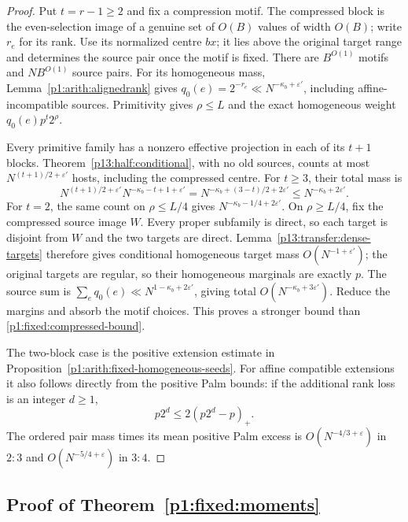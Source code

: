 \begin{proof}
Put $t=r-1\ge2$ and fix a compression motif. The compressed block
is the even-selection image of a genuine set of $O(B)$ values of
width $O(B)$; write $r_e$ for its rank.
Use its normalized centre $bx$; it lies above the original target
range and determines the source pair once the motif is fixed.
There are $B^{O(1)}$ motifs and $NB^{O(1)}$ source pairs.
For its homogeneous mass, Lemma~\ref{p1:arith:alignedrank} gives
$q_0(e)=2^{-r_e}\ll N^{-\kappa_b+\varepsilon'}$, including
affine-incompatible sources. Primitivity gives $\rho\le L$ and
the exact homogeneous weight $q_0(e)p^t2^\rho$.

Every primitive family has a nonzero effective projection in each
of its $t+1$ blocks. Theorem~\ref{p13:half:conditional}, with no old
sources, counts at most $N^{(t+1)/2+\varepsilon'}$ hosts,
including the compressed centre. For $t\ge3$, their total mass is
\[
 N^{(t+1)/2+\varepsilon'}N^{-\kappa_b-t+1+\varepsilon'}
   =N^{-\kappa_b+(3-t)/2+2\varepsilon'}
   \le N^{-\kappa_b+2\varepsilon'}.
\]
For $t=2$, the same count on $\rho\le L/4$ gives
$N^{-\kappa_b-1/4+2\varepsilon'}$.
On $\rho\ge L/4$, fix the compressed source image $W$.
Every proper subfamily is direct, so each target is disjoint from
$W$ and the two targets are direct. Lemma~\ref{p13:transfer:dense-targets}
therefore gives conditional homogeneous target mass
$O(N^{-1+\varepsilon'})$; the original targets are regular, so their
homogeneous marginals are exactly $p$.
The source sum is $\sum_e q_0(e)\ll N^{1-\kappa_b+2\varepsilon'}$,
giving total $O(N^{-\kappa_b+3\varepsilon'})$.
Reduce the margins and absorb the motif choices. This proves a
stronger bound than \eqref{p1:fixed:compressed-bound}.

The two-block case is the positive extension estimate
in Proposition~\ref{p1:arith:fixed-homogeneous-seeds}.
For affine compatible extensions it also follows
directly from the positive Palm bounds:
if the additional rank loss is an integer \(d\ge1\),
\[
 p2^d\le2(p2^d-p)_+.
\]
The ordered pair mass times its mean positive Palm
excess is \(O(N^{-4/3+\varepsilon})\) in \(2:3\)
and \(O(N^{-5/4+\varepsilon})\) in \(3:4\).
\end{proof}

\subsection{Proof of Theorem~\ref{p1:fixed:moments}}
\label{p14:comp:fixed-moments}

